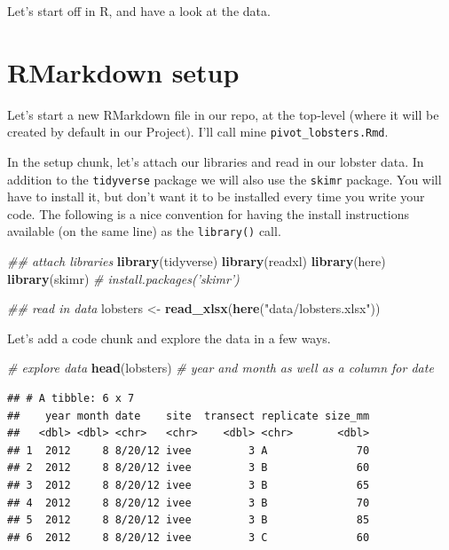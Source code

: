 \documentclass[]{book}
\newenvironment{Shaded}{\begin{snugshade}}{\end{snugshade}}
\newcommand{\CommentTok}[1]{\textcolor[rgb]{0.56,0.35,0.01}{\textit{#1}}}
\newcommand{\KeywordTok}[1]{\textcolor[rgb]{0.13,0.29,0.53}{\textbf{#1}}}
\newcommand{\NormalTok}[1]{#1}
\newcommand{\StringTok}[1]{\textcolor[rgb]{0.31,0.60,0.02}{#1}}
\begin{document}
Let's start off in R, and have a look at the data.

\hypertarget{rmarkdown-setup}{%
\section{RMarkdown setup}\label{rmarkdown-setup}}

Let's start a new RMarkdown file in our repo, at the top-level (where it will be created by default in our Project). I'll call mine \texttt{pivot\_lobsters.Rmd}.

In the setup chunk, let's attach our libraries and read in our lobster data. In addition to the \texttt{tidyverse} package we will also use the \texttt{skimr} package. You will have to install it, but don't want it to be installed every time you write your code. The following is a nice convention for having the install instructions available (on the same line) as the \texttt{library()} call.

\begin{Shaded}
\begin{Highlighting}[]
\CommentTok{## attach libraries}
\KeywordTok{library}\NormalTok{(tidyverse)}
\KeywordTok{library}\NormalTok{(readxl)}
\KeywordTok{library}\NormalTok{(here)}
\KeywordTok{library}\NormalTok{(skimr) }\CommentTok{# install.packages('skimr')}

\CommentTok{## read in data}
\NormalTok{lobsters <-}\StringTok{ }\KeywordTok{read_xlsx}\NormalTok{(}\KeywordTok{here}\NormalTok{(}\StringTok{"data/lobsters.xlsx"}\NormalTok{))}
\end{Highlighting}
\end{Shaded}

Let's add a code chunk and explore the data in a few ways.

\begin{Shaded}
\begin{Highlighting}[]
\CommentTok{# explore data}
\KeywordTok{head}\NormalTok{(lobsters) }\CommentTok{# year and month as well as a column for date}
\end{Highlighting}
\end{Shaded}

\begin{verbatim}
## # A tibble: 6 x 7
##    year month date    site  transect replicate size_mm
##   <dbl> <dbl> <chr>   <chr>    <dbl> <chr>       <dbl>
## 1  2012     8 8/20/12 ivee         3 A              70
## 2  2012     8 8/20/12 ivee         3 B              60
## 3  2012     8 8/20/12 ivee         3 B              65
## 4  2012     8 8/20/12 ivee         3 B              70
## 5  2012     8 8/20/12 ivee         3 B              85
## 6  2012     8 8/20/12 ivee         3 C              60
\end{verbatim}
\end{document}
